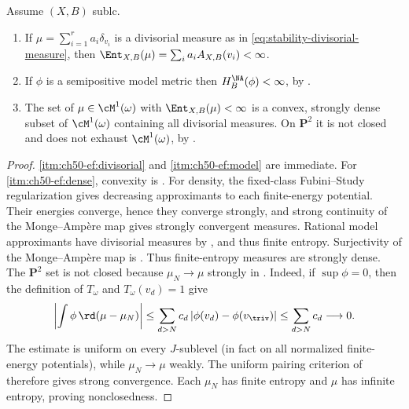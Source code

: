 \begin{proposition}
\label{prop:ch50-entropy-finite-cases}
Assume $(X,B)$ sublc.
\begin{enumerate}
\item\label{itm:ch50-ef:divisorial}
      If $\mu=\sum_{i=1}^ra_i\delta_{v_i}$ is a divisorial measure as in
      \eqref{eq:stability-divisorial-measure}, then
      $\Ent_{X,B}(\mu)=\sum_ia_iA_{X,B}(v_i)<\infty$.
\item\label{itm:ch50-ef:model}
      If $\phi$ is a semipositive model metric then
      $H^{\NA}_B(\phi)<\infty$, by
      .
\item\label{itm:ch50-ef:dense}
      The set of $\mu\in\cM^1(\omega)$ with $\Ent_{X,B}(\mu)<\infty$
      is a convex, strongly dense subset of $\cM^1(\omega)$ containing
      all divisorial measures.  On $\mathbf P^2$ it is not closed and
      does not exhaust $\cM^1(\omega)$, by
      .
\end{enumerate}
\end{proposition}

\begin{proof}
\cref{itm:ch50-ef:divisorial} and \cref{itm:ch50-ef:model} are immediate.
For \cref{itm:ch50-ef:dense}, convexity is
.  For density, the fixed-class Fubini--Study regularization
 gives decreasing approximants to each
finite-energy potential.  Their energies converge, hence they converge
strongly, and strong continuity of the Monge--Amp\`ere map gives strongly
convergent measures.  Rational model approximants have divisorial measures
by , and thus finite entropy.
Surjectivity of the Monge--Amp\`ere map is
.  Thus finite-entropy measures are strongly
dense.  The $\mathbf P^2$ set is not closed because $\mu_N\to\mu$ strongly in
.  Indeed, if $\sup\phi=0$, then the
definition of $T_\omega$ and $T_\omega(v_d)=1$ give
\[
 \left|\int\phi\,\rd(\mu-\mu_N)\right|
 \le\sum_{d>N}c_d\,|\phi(v_d)-\phi(v_{\triv})|
 \le\sum_{d>N}c_d\longrightarrow0.
\]
The estimate is uniform on every $J$-sublevel (in fact on all normalized
finite-energy potentials), while $\mu_N\to\mu$ weakly.  The uniform
pairing criterion of  therefore gives strong
convergence.  Each $\mu_N$ has finite entropy and $\mu$ has infinite
entropy, proving nonclosedness.
\end{proof}

